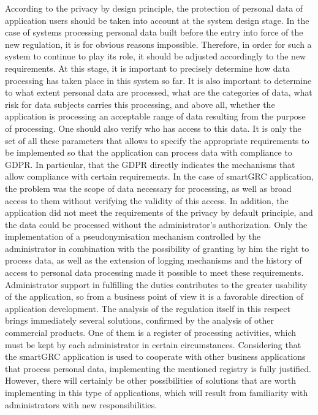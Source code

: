 \documentclass[en, noamssymb]{mgr}
\begin{document}
According to the privacy by design principle, the protection of personal data of application users should be taken into account at the system design stage. In the case of systems processing personal data built before the entry into force of the new regulation, it is for obvious reasons impossible. Therefore, in order for such a system to continue to play its role, it should be adjusted accordingly to the new requirements. At this stage, it is important to precisely determine how data processing has taken place in this system so far. It is also important to determine to what extent personal data are processed, what are the categories of data, what risk for data subjects carries this processing, and above all, whether the application is processing an acceptable range of data resulting from the purpose of processing. One should also verify who has access to this data. It is only the set of all these parameters that allows to specify the appropriate requirements to be implemented so that the application can process data with compliance to GDPR. In particular, that the GDPR directly indicates the mechanisms that allow compliance with certain requirements. In the case of smartGRC application, the problem was the scope of data necessary for processing, as well as broad access to them without verifying the validity of this access. In addition, the application did not meet the requirements of the privacy by default principle, and the data could be processed without the administrator's authorization. Only the implementation of a pseudonymisation mechanism controlled by the administrator in combination with the possibility of granting by him the right to process data, as well as the extension of logging mechanisms and the history of access to personal data processing made it possible to meet these requirements.\\
\indent Administrator support in fulfilling the duties contributes to the greater usability of the application, so from a business point of view it is a favorable direction of application development. The analysis of the regulation itself in this respect brings immediately several solutions, confirmed by the analysis of other commercial products. One of them is a register of processing activities, which must be kept by each administrator in certain circumstances. Considering that the smartGRC application is used to cooperate with other business applications that process personal data, implementing the mentioned registry is fully justified. However, there will certainly be other possibilities of solutions that are worth implementing in this type of applications, which will result from familiarity with administrators with new responsibilities.
\end{document}
